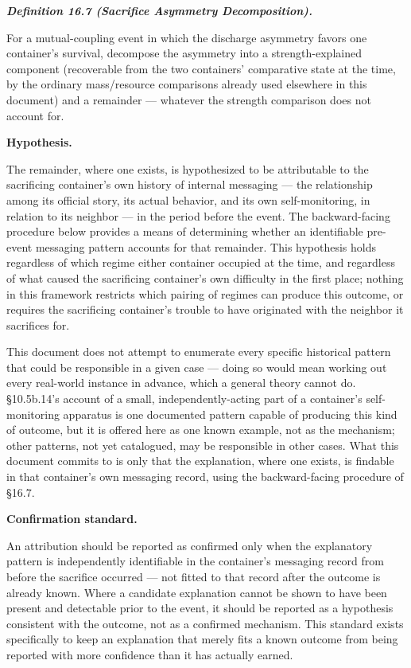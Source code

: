 \documentclass[
]{article}
\begin{document}
\emph{\textbf{Definition 16.7 (Sacrifice Asymmetry Decomposition).}}

For a mutual-coupling event in which the discharge asymmetry favors one
container's survival, decompose the asymmetry into a strength-explained
component (recoverable from the two containers' comparative state at the
time, by the ordinary mass/resource comparisons already used elsewhere
in this document) and a remainder --- whatever the strength comparison
does not account for.

\textbf{Hypothesis.}

The remainder, where one exists, is hypothesized to be attributable to
the sacrificing container's own history of internal messaging --- the
relationship among its official story, its actual behavior, and its own
self-monitoring, in relation to its neighbor --- in the period before
the event. The backward-facing procedure below provides a means of
determining whether an identifiable pre-event messaging pattern accounts
for that remainder. This hypothesis holds regardless of which regime
either container occupied at the time, and regardless of what caused the
sacrificing container's own difficulty in the first place; nothing in
this framework restricts which pairing of regimes can produce this
outcome, or requires the sacrificing container's trouble to have
originated with the neighbor it sacrifices for.

This document does not attempt to enumerate every specific historical
pattern that could be responsible in a given case --- doing so would
mean working out every real-world instance in advance, which a general
theory cannot do. §10.5b.14's account of a small, independently-acting
part of a container's self-monitoring apparatus is one documented
pattern capable of producing this kind of outcome, but it is offered
here as one known example, not as the mechanism; other patterns, not yet
catalogued, may be responsible in other cases. What this document
commits to is only that the explanation, where one exists, is findable
in that container's own messaging record, using the backward-facing
procedure of §16.7.

\textbf{Confirmation standard.}

An attribution should be reported as confirmed only when the explanatory
pattern is independently identifiable in the container's messaging
record from before the sacrifice occurred --- not fitted to that record
after the outcome is already known. Where a candidate explanation cannot
be shown to have been present and detectable prior to the event, it
should be reported as a hypothesis consistent with the outcome, not as a
confirmed mechanism. This standard exists specifically to keep an
explanation that merely fits a known outcome from being reported with
more confidence than it has actually earned.
\end{document}
